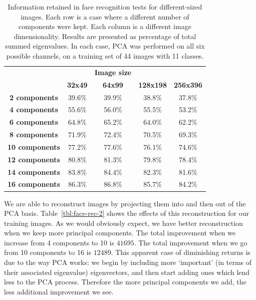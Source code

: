 \begin{table}[h!]
  \centering
  \begin{tabular}{c c c c c}
    \toprule
    \textbf{ } & \textbf{} & \textbf{Image size} & \textbf{} & \textbf{}\\
    \textbf{ } & \textbf{ 32x49 } & \textbf{ 64x99 } & \textbf{128x198} & \textbf{256x396}\\
    \midrule
    \textbf{2 components} & 39.6\% & 39.9\% & 38.8\% & 37.8\% \\
    \textbf{4 components} & 55.6\% & 56.0\% & 55.5\% & 53.2\% \\
    \textbf{6 components} & 64.8\% & 65.2\% & 64.0\% & 62.2\% \\
    \textbf{8 components} & 71.9\% & 72.4\% & 70.5\% & 69.3\% \\
    \textbf{10 components} & 77.2\% & 77.6\% & 76.1\% & 74.6\% \\
    \textbf{12 components} & 80.8\% & 81.3\% & 79.8\% & 78.4\% \\
    \textbf{14 components} & 83.8\% & 84.4\% & 82.3\% & 81.6\% \\
    \textbf{16 components} & 86.3\% & 86.8\% & 85.7\% & 84.2\% \\
    \bottomrule
  \end{tabular}
  \caption[Information retained in face recognition tests for different-sized images]{Information retained in face recognition tests for different-sized images. Each row is a case where a different number of components were kept. Each column is a different image dimensionality. Results are presented as percentage of total summed eigenvalues. In each case, PCA was performed on all six possible channels, on a training set of 44 images with 11 classes.}
  \label{tbl:face-rec-1}
\end{table}

We are able to reconstruct images by projecting them into and then out of the PCA basis. Table~\ref{tbl:face-rec-2} shows the effects of this reconstruction for our training images. As we would obviously expect, we have better reconstruction when we keep more principal components. The total improvement when we increase from 4 components to 10 is $41695$. The total improvement when we go from 10 components to 16 is $12489$. This apparent case of diminishing returns is due to the way PCA works: we begin by including more `important' (in terms of their associated eigenvalue) eigenvectors, and then start adding ones which lend less to the PCA process. Therefore the more principal components we add, the less additional improvement we see.

